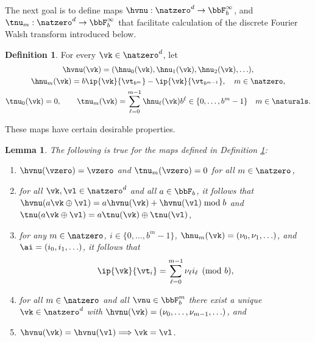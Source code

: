 \documentclass[]{elsarticle}
\newtheorem{lem}{Lemma}
\theoremstyle{definition}
\newtheorem{defin}{Definition}
\renewcommand{\bbK}{\natzero^d}
\begin{document}
The next goal is to define maps $\hvnu : \bbK \to \bbF_b^{\infty}$, and $\tnu_m : \bbK \to \bbF_b^{\infty}$ that facilitate calculation of the discrete Fourier Walsh transform introduced below.

\begin{defin} \label{numapdef} For every $\vk \in \bbK$, let
\begin{subequations} \label{numapdefeq}
\begin{gather}
\hvnu(\vk)=(\hnu_0(\vk), \hnu_1(\vk), \hnu_2(\vk), \ldots ), \\
\hnu_m(\vk)=b\ip{\vk}{\vt_{b^m}}-\ip{\vk}{\vt_{b^{m-1}}}, \quad m \in \natzero, \\
\tnu_0(\vk) = 0, \qquad \tnu_m(\vk) = \sum_{\ell=0}^{m-1} \hnu_{\ell}(\vk) b^{\ell} \in \{0, \ldots, b^{m}-1\} \quad m \in \naturals.
\end{gather}
\end{subequations}
\end{defin}

These maps have certain desirable properties.

\begin{lem} \label{numaplem} The following is true for the maps defined in Definition \ref{numapdef}:
\begin{enumerate}
\renewcommand{\labelenumi}{\alph{enumi})}

\item $\hvnu(\vzero)=\vzero$ and $\tnu_m(\vzero) = 0$ for all $m \in \natzero$,

\item for all $\vk, \vl \in \bbK$ and all $a \in \bbF_b$, it follows that $\hvnu(a\vk \oplus \vl)=a\hvnu(\vk) + \hvnu(\vl) \bmod b$ and $\tnu(a\vk \oplus \vl)=a\tnu(\vk) \oplus \tnu(\vl)$,

\item for any $m \in \natzero$, $i \in \{0, \ldots, b^m-1\}$,  $\hnu_m(\vk)=(\nu_0, \nu_1, \ldots)$, and $\ai=(i_0, i_1, \ldots)$, it follows that
\begin{equation} \label{nuwisum}
\ip{\vk}{\vt_i} = \sum_{\ell=0}^{m-1} \nu_\ell i_{\ell} \pmod b,
\end{equation}

\item for all $m\in \natzero$ and all $\vnu \in \bbF_b^{m}$ there exist a unique $\vk \in \bbK$ with $\hvnu(\vk)=(\nu_0, \ldots, \nu_{m-1}, \ldots)$, and

\item $\hvnu(\vk)=\hvnu(\vl) \Longrightarrow \vk = \vl$.

\end{enumerate}
\end{lem}
\end{document}
